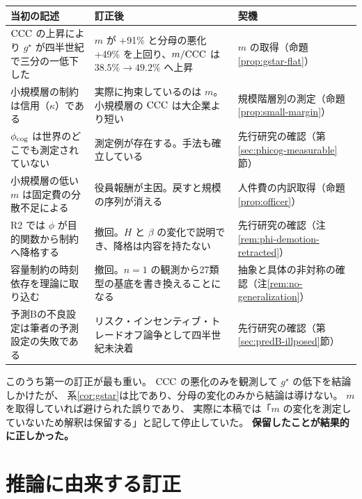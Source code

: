 \begin{center}
\begin{tabularx}{\textwidth}{@{}XXl@{}}
\toprule
当初の記述 & 訂正後 & 契機 \\
\midrule
$\mathrm{CCC}$ の上昇により $g^\star$ が四半世紀で三分の一低下した
& $m$ が +91\% と分母の悪化 +49\% を上回り、$m/\mathrm{CCC}$ は $38.5\%\to49.2\%$ へ上昇
& $m$ の取得（命題\ref{prop:gstar-flat}） \\
\addlinespace
小規模層の制約は信用（$\kappa$）である
& 実際に拘束しているのは $m$。小規模層の $\mathrm{CCC}$ は大企業より短い
& 規模階層別の測定（命題\ref{prop:small-margin}） \\
\addlinespace
$\phi_{\rm cog}$ は世界のどこでも測定されていない
& 測定例が存在する。手法も確立している
& 先行研究の確認（第\ref{sec:phicog-measurable}節） \\
\addlinespace
小規模層の低い $m$ は固定費の分散不足による
& 役員報酬が主因。戻すと規模の序列が消える
& 人件費の内訳取得（命題\ref{prop:officer}） \\
\addlinespace
R2 では $\phi$ が目的関数から制約へ降格する
& 撤回。$H$ と $\beta$ の変化で説明でき、降格は内容を持たない
& 先行研究の確認（注\ref{rem:phi-demotion-retracted}） \\
\addlinespace
容量制約の時刻依存を理論に取り込む
& 撤回。$n=1$ の観測から27類型の基底を書き換えることになる
& 抽象と具体の非対称の確認（注\ref{rem:no-generalization}） \\
\addlinespace
予測Bの不良設定は筆者の予測設定の失敗である
& リスク・インセンティブ・トレードオフ論争として四半世紀未決着
& 先行研究の確認（第\ref{sec:predB-illposed}節） \\
\bottomrule
\end{tabularx}
\label{tab:measurement-corrections}
\end{center}

このうち第一の訂正が最も重い。
$\mathrm{CCC}$ の悪化のみを観測して $g^\star$ の低下を結論しかけたが、
系\ref{cor:gstar}は比であり、分母の変化のみから結論は導けない。
$m$ を取得していれば避けられた誤りであり、
実際に本稿では「$m$ の変化を測定していないため解釈は保留する」と記して停止していた。
\textbf{保留したことが結果的に正しかった。}

\section{推論に由来する訂正}

